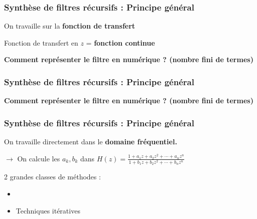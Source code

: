 \documentclass{beamer}
\begin{document}
\begin{frame}
\frametitle{Synthèse de filtres récursifs : Principe général}

\begin{block}{}
On travaille sur la \textbf{fonction de transfert} 
\end{block}

\vspace{1cm} 

Fonction de transfert en $z$ = \textbf{fonction continue }\\

\vspace{1cm}

\textbf{Comment représenter le filtre en numérique ? (nombre fini de termes)}


\end{frame}

\begin{frame}
\frametitle{Synthèse de filtres récursifs : Principe général}
\textbf{Comment représenter le filtre en numérique ? (nombre fini de termes)}\\
\vspace{1cm}
\vspace{1cm} 




\end{frame}

\begin{frame}
\frametitle{Synthèse de filtres récursifs : Principe général}

 
\begin{block}{}
On travaille directement dans le \textbf{domaine fréquentiel.}
\end{block}
\vspace{1cm}
$\rightarrow$ On calcule les $a_k,b_k$ dans $H(z) = \frac{\displaystyle 1+ a_1 z + a_2 z^2 + \cdots + a_n z^n }{\displaystyle 1+ b_1 z + b_2 z^2 + \cdots + b_n z^n}$ \\
\vspace{1cm}

2 grandes classes de méthodes : 
\begin{itemize}
\item<2->  
\vspace{0.3cm}

\item<3-> Techniques itératives

\end{itemize}
\end{frame}
\end{document}
